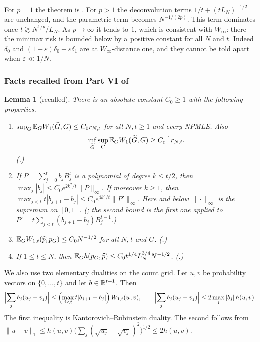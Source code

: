 \documentclass[11pt]{amsart}
\newtheorem{lemma}[theorem]{Lemma}
\theoremstyle{definition}
\theoremstyle{remark}
\begin{document}
For $p=1$ the theorem is \cite[Part~VI]{K-029}.  For $p>1$ the
deconvolution terms $1/t+(tL_N)^{-1/2}$ are unchanged, and the parametric
term becomes $N^{-1/(2p)}$.  This term dominates once
$t\gtrsim N^{1/p}/L_N$.  As $p\to\infty$ it tends to $1$, which is
consistent with $W_\infty$: there the minimax risk is bounded below by a
positive constant for all $N$ and $t$.  Indeed $\delta_0$ and
$(1-\varepsilon)\delta_0+\varepsilon\delta_1$ are at $W_\infty$-distance one,
and they cannot be told apart when $\varepsilon\ll1/N$.

\subsubsection{Facts recalled from Part VI of \cite{K-029}}

\begin{lemma}[recalled]\label{R5:lem:recall}
There is an absolute constant $C_0\ge1$ with the following properties.
\begin{enumerate}
\item[(F1)] $\sup_G\mathbb{E}_GW_1(\widehat G,G)\le C_0r_{N,t}$ for all $N,t\ge1$
 and every NPMLE.  Also
 \[\inf_{\widetilde G}\sup_G\mathbb{E}_GW_1(\widetilde G,G)\ge C_0^{-1}r_{N,t}.\]
 \emph{(\cite[Part VI, Theorem p06:bm:full]{K-029}.)}
\item[(F2)] If $P=\sum_{j=0}^tb_jB_j^t$ is a polynomial of degree $k\le t/2$,
 then $\max_j|b_j|\le C_0e^{2k^2/t}\|P\|_{\infty}$.  If moreover $k\ge1$, then
 $\max_{j<t}t|b_{j+1}-b_j|\le C_0e^{4k^2/t}\|P'\|_{\infty}$.  Here and below
 $\|\cdot\|_\infty$ is the supremum on $[0,1]$.
 \emph{(\cite[Part VI, Lemma p06:bm:approx]{K-029}; the second bound is the
 first one applied to $P'=t\sum_{j<t}(b_{j+1}-b_j)B^{t-1}_j$.)}
\item[(F3)] $\mathbb{E}_GW_{1,t}(\widehat p,p_G)\le C_0N^{-1/2}$ for all $N,t$ and $G$.
 \emph{(\cite[Part VI, Lemma p06:bm:transport]{K-029}.)}
\item[(F4)] If $1\le t\le N$, then
 $\mathbb{E}_Gh(p_G,\widehat p)\le C_0t^{1/4}L_N^{3/4}N^{-1/2}$.
 \emph{(\cite[Part VI, Corollary p06:bm:hellinger]{K-029}.)}
\end{enumerate}
\end{lemma}

We also use two elementary dualities on the count grid.  Let $u,v$ be
probability vectors on $\{0,\dots,t\}$ and let $b\in\mathbb{R}^{t+1}$.  Then
\begin{equation}\label{R5:eq:griddual}
 \Bigl|\sum_jb_j(u_j-v_j)\Bigr|\le\Bigl(\max_{j<t}t|b_{j+1}-b_j|\Bigr)\,W_{1,t}(u,v),
 \qquad
 \Bigl|\sum_jb_j(u_j-v_j)\Bigr|\le 2\max_j|b_j|\,h(u,v).
\end{equation}
The first inequality is Kantorovich--Rubinstein duality.  The second follows
from $\|u-v\|_1\le h(u,v)\bigl(\sum_j(\sqrt{u_j}+\sqrt{v_j})^2\bigr)^{1/2}\le2h(u,v)$.
\end{document}
